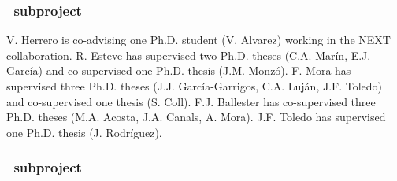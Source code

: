 \subsubsection*{\sUPV\ subproject}
V. Herrero is co-advising one Ph.D. student (V. Alvarez) working in the NEXT collaboration. R. Esteve has supervised two Ph.D. theses (C.A. Marín, 
E.J. García) 
and co-supervised one Ph.D. thesis (J.M. Monzó). 
F. Mora has supervised three Ph.D. theses (J.J. García-Garrigos,
 C.A. Luján, 
 J.F. Toledo)
 and co-supervised one thesis (S. Coll).
  F.J. Ballester has co-supervised three Ph.D. theses (M.A. Acosta,
  J.A. Canals, 
  A. Mora). 
  J.F. Toledo has supervised one Ph.D. thesis (J. Rodríguez). 


\subsubsection*{\sUSC\ subproject}

